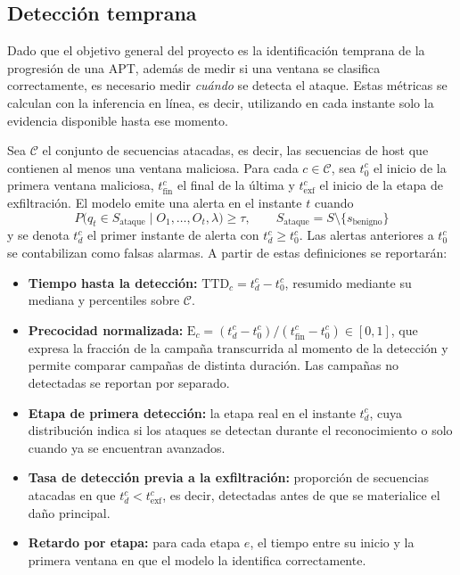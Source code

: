 \subsection{Detección temprana}
Dado que el objetivo general del proyecto es la identificación temprana de la progresión de una APT, además de medir si una ventana se clasifica correctamente, es necesario medir \textit{cuándo} se detecta el ataque. Estas métricas se calculan con la inferencia en línea, es decir, utilizando en cada instante solo la evidencia disponible hasta ese momento.

Sea $\mathcal{C}$ el conjunto de secuencias atacadas, es decir, las secuencias de host que contienen al menos una ventana maliciosa. Para cada $c \in \mathcal{C}$, sea $t_0^c$ el inicio de la primera ventana maliciosa, $t_{\text{fin}}^c$ el final de la última y $t_{\text{exf}}^c$ el inicio de la etapa de exfiltración. El modelo emite una alerta en el instante $t$ cuando
\begin{equation}
P\big(q_t \in S_{\text{ataque}} \mid O_1, \dots, O_t, \lambda\big) \geq \tau, \qquad S_{\text{ataque}} = S \setminus \{s_{\text{benigno}}\}
\end{equation}
y se denota $t_d^c$ el primer instante de alerta con $t_d^c \geq t_0^c$. Las alertas anteriores a $t_0^c$ se contabilizan como falsas alarmas. A partir de estas definiciones se reportarán:

\begin{itemize}
    \item \textbf{Tiempo hasta la detección:} $\mathrm{TTD}_c = t_d^c - t_0^c$, resumido mediante su mediana y percentiles sobre $\mathcal{C}$.
    \item \textbf{Precocidad normalizada:} $\mathrm{E}_c = (t_d^c - t_0^c) / (t_{\text{fin}}^c - t_0^c) \in [0, 1]$, que expresa la fracción de la campaña transcurrida al momento de la detección y permite comparar campañas de distinta duración. Las campañas no detectadas se reportan por separado.
    \item \textbf{Etapa de primera detección:} la etapa real en el instante $t_d^c$, cuya distribución indica si los ataques se detectan durante el reconocimiento o solo cuando ya se encuentran avanzados.
    \item \textbf{Tasa de detección previa a la exfiltración:} proporción de secuencias atacadas en que $t_d^c < t_{\text{exf}}^c$, es decir, detectadas antes de que se materialice el daño principal.
    \item \textbf{Retardo por etapa:} para cada etapa $e$, el tiempo entre su inicio y la primera ventana en que el modelo la identifica correctamente.
\end{itemize}

